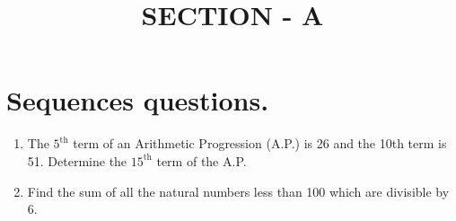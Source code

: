\documentclass{article}
\title{SECTION - A}
\begin{document}
\section*{\textbf{Sequences questions.}}

\begin{enumerate}
    \item The $5^{\text{th}}$ term of an Arithmetic Progression (A.P.) is 26 and the 10th term is 51. Determine the $15^{\text{th}}$ term of the A.P.
    \item Find the sum of all the natural numbers less than 100 which are divisible by 6.
\end{enumerate}
\end{document}
